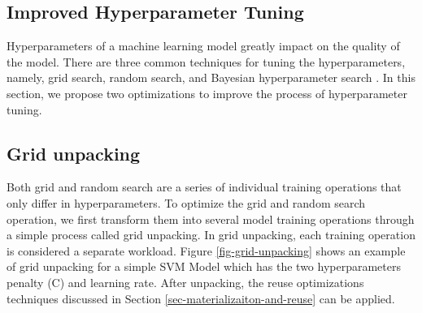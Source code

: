\subsection{Improved Hyperparameter Tuning} \label{sec-hyperparam-optimization}
Hyperparameters of a machine learning model greatly impact on the quality of the model.
There are three common techniques for tuning the hyperparameters, namely, grid search, random search, and Bayesian hyperparameter search \cite{hutter2011sequential,snoek2012practical}.
In this section, we propose two optimizations to improve the process of hyperparameter tuning.

\subsection{Grid unpacking}
Both grid and random search are a series of individual training operations that only differ in hyperparameters.
To optimize the grid and random search operation, we first transform them into several model training operations through a simple process called grid unpacking.
In grid unpacking, each training operation is considered a separate workload.
Figure \ref{fig-grid-unpacking} shows an example of grid unpacking for a simple SVM Model which has the two hyperparameters penalty (C) and learning rate.
After unpacking, the reuse optimizations techniques discussed in Section \ref{sec-materializaiton-and-reuse} can be applied.
